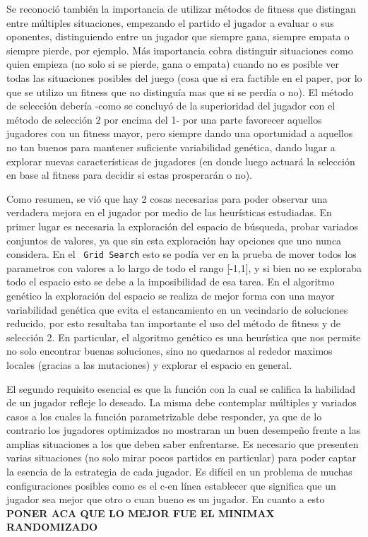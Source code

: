 \documentclass[A4paper,oneside,fleqn,11pt]{article}
\theoremstyle{definition}
\begin{document}
Se reconoció también la importancia de utilizar métodos de fitness que distingan entre múltiples situaciones, empezando el partido el jugador a evaluar o sus oponentes, distinguiendo entre un jugador que siempre gana, siempre empata o siempre pierde, por ejemplo. Más importancia cobra distinguir situaciones como quien empieza (no solo si se pierde, gana o empata) cuando no es posible ver todas las situaciones posibles del juego (cosa que si era factible en el paper, por lo que se utilizo un fitness que no distinguía mas que si se perdía o no). El método de selección debería -como se concluyó de la superioridad del jugador con el método de selección 2 por encima del 1- por una parte favorecer aquellos jugadores con un fitness mayor, pero siempre dando una oportunidad a aquellos no tan buenos para mantener suficiente variabilidad genética, dando lugar a explorar nuevas características de jugadores (en donde luego actuará la selección en base al fitness para decidir si estas prosperarán o no).

Como resumen, se vió que hay 2 cosas necesarias para poder observar una verdadera mejora en el jugador por medio de las heurísticas estudiadas. En primer lugar es necesaria la exploración del espacio de búsqueda, probar variados conjuntos de valores, ya que sin esta exploración hay opciones que uno nunca considera. En el \texttt{ Grid Search} esto se podía ver en la prueba de mover todos los parametros con valores a lo largo de todo el rango [-1,1], y si bien no se exploraba todo el espacio esto se debe a la imposibilidad de esa tarea. En el algoritmo genético la exploración del espacio se realiza de mejor forma con una mayor variabilidad genética que evita el estancamiento en un vecindario de soluciones reducido, por esto resultaba tan importante el uso del método de fitness y de selección 2. En particular, el algoritmo genético es una heurística que nos permite no solo encontrar buenas soluciones, sino no quedarnos al rededor maximos locales (gracias a las mutaciones) y explorar el espacio en general.

El segundo requisito esencial es que la función con la cual se califica la habilidad de un jugador refleje lo deseado. La misma debe contemplar múltiples y variados casos a los cuales la función parametrizable debe responder, ya que de lo contrario los jugadores optimizados no mostraran un buen desempeño frente a las amplias situaciones a los que deben saber enfrentarse. Es necesario que presenten varias situaciones (no solo mirar pocos partidos en particular) para poder captar la esencia de la estrategia de cada jugador. Es difícil en un problema de muchas configuraciones posibles como es el c-en línea establecer que significa que un jugador sea mejor que otro o cuan bueno es un jugador. En cuanto a esto
\textbf{PONER ACA QUE LO MEJOR FUE EL MINIMAX RANDOMIZADO}
\end{document}
